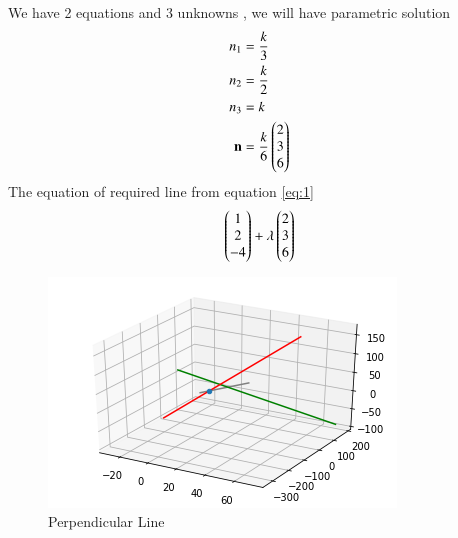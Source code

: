 \documentclass[journal,12pt,twocolumn]{IEEEtran}
\begin{document}
We have 2 equations and 3 unknowns , we will have parametric solution
\begin{align}
 n_1 &=  \frac{k}{3}\\ n_2 &=  \frac{k}{2}\\ n_3 &= k \\
\mathbf{n} &= \frac{k}{6} \begin{pmatrix}2 \\ 3 \\6\end{pmatrix}
\end{align}
The equation of required line from equation \eqref{eq:1}
\begin{align}
	\begin{pmatrix}1\\2\\-4\end{pmatrix} + \lambda\begin{pmatrix}2\\3\\6\end{pmatrix} 
\end{align}
\clearpage
\begin{figure}[!htbp]
    \centering
    \includegraphics[width =\columnwidth]{assignment1.png}
    \caption{Perpendicular Line }
    \label{fig:1}
\end{figure}
\end{document}
